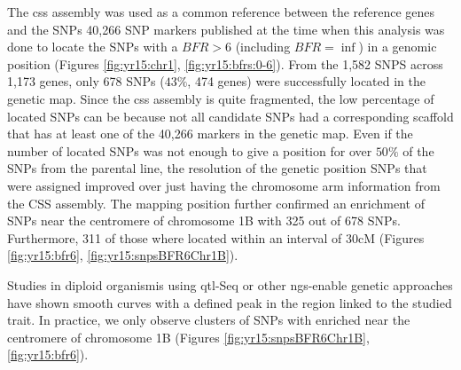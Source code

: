 The \acrshort{css} assembly was used as a common reference between the reference genes and the SNPs  40,266 SNP markers published at the time when this analysis was done \citep{Wang2014} to locate the SNPs with a $BFR>6$ (including $BFR=\inf$) in a genomic position (Figures \ref{fig:yr15:chr1}, \ref{fig:yr15:bfrs:0-6}).  
From the 1,582 SNPS across 1,173 genes,  only 678 SNPs ($43\%$, 474 genes) were successfully located in the genetic map. 
Since the \acrshort{css} assembly is quite fragmented, the low percentage of located SNPs can be because not all candidate SNPs had a corresponding scaffold that has at least one of the 40,266 markers in the genetic map. 
Even if the number of located SNPs was not enough to give a position for over $50\%$ of the SNPs from the parental line, the resolution of the genetic position SNPs that were assigned improved over just having the chromosome arm information from the CSS assembly. 
The mapping position further confirmed an enrichment of SNPs near the centromere of chromosome 1B with 325 out of 678 SNPs. 
Furthermore, 311 of those where located within an interval of 30cM (Figures \ref{fig:yr15:bfr6}, \ref{fig:yr15:snpsBFR6Chr1B}). 

Studies in diploid organismis using \acrshort{qtl}-Seq \citep{Takagi2013} or other \acrshort{ngs}-enable genetic approaches \citep{James2013} have shown smooth curves with a defined peak in the region linked to the studied trait. 
In practice, we only observe clusters of SNPs with  enriched  near the centromere of chromosome 1B (Figures \ref{fig:yr15:snpsBFR6Chr1B}, \ref{fig:yr15:bfr6}). 

